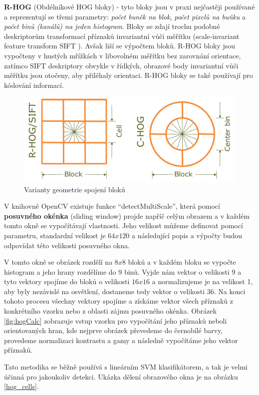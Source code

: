 \textbf{R-HOG} (Obdélníkové HOG bloky) - tyto bloky jsou v praxi nejčastěji používané a reprezentují se třemi parametry: \textit{počet buněk na blok}, \textit{počet pixelů na buňku} a \textit{počet binů (kanálů) na jeden histogram}. Bloky se zdají trochu podobné deskriptorům transformací příznaků invariantní vůči měřítku (scale-invariant feature transform SIFT \cite{siftPaper}). Avšak liší se výpočtem bloků. R-HOG bloky jsou vypočteny v hustých mřížkách v libovolném měřítku bez zarovnání orientace, zatímco SIFT deskriptory obvykle v řídkých, obrazové body invariantní vůči měřítku jsou otočeny, aby přiléhaly orientaci. R-HOG bloky se také používají pro kódování informací. 
\begin{figure}[H]
  \centering
  \includegraphics[width=12cm]{figures/hog_variants.pdf}
  \caption{Varianty geometrie spojení bloků \cite{hog:dalal}}
  \label{variants_block}
\end{figure}
V knihovně OpenCV existuje funkce ``detectMultiScale'', která pomocí \textbf{posuvného okénka} (sliding window) projde napříč celým obrazem a v každém tomto okně se vypočítávají vlastnosti. Jeho velikost můžeme definovat pomocí parametru, standardní velikost je $64x120$ a následující popis a výpočty budou odpovídat této velikosti posuvného okna.  

V tomto okně se obrázek rozdělí na $8x8$ bloků a v každém bloku se vypočte histogram a jeho hrany rozdělíme do 9 binů. Vyjde nám vektor o velikosti 9 a tyto vektory spojíme do bloků o velikosti $16x16$ a normalizujeme je na velikost 1, aby byly nezávislé na osvětlení, dostaneme tedy vektor o velikosti 36. Na konci tohoto procesu všechny vektory spojíme a získáme vektor všech příznaků z konkrétního vzorku nebo z oblasti zájmu posuvného okénka. Obrázek \ref{fig:hogCalc} zobrazuje vstup vzorku pro vypočítání jeho příznaků neboli orientovaných hran, kde nejprve obrázek převedeme do černobílé barvy, provedeme normalizaci kontrastu a gamy a následně vypočítáme jeho vektor příznaků.

Tato metodika se běžně používá s lineárním SVM klasifikátorem, a tak je velmi účinná pro jakoukoliv detekci. 
Ukázka dělení obrazového okna je na obrázku \ref{hog_cells}.

